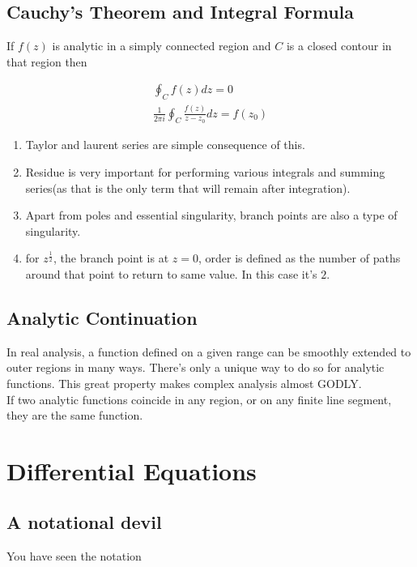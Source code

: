 \documentclass{report}
\begin{document}
\section{Cauchy's Theorem and Integral Formula} If $f(z)$ is analytic in a simply connected region and $C$ is a closed contour in that region then

\begin{gather}
\oint_{C}f(z)dz = 0\\
\frac{1}{2\pi i}\oint_{C}\frac{f(z)}{z-z_0}dz = f(z_0)
\end{gather}

\begin{enumerate}
  \item Taylor and laurent series are simple consequence of this.
  \item Residue is very important for performing various integrals and summing series(as that is the only term that will remain after integration). 
  \item Apart from poles and essential singularity, branch points are also a type of singularity.
  \item for $z^\frac{1}{2}$, the branch point is at $z=0$, order is defined as the number of paths around that point to return to same value. In this case it's $2$.
\end{enumerate}


\section{Analytic Continuation}
In real analysis, a function defined on a given range can be smoothly extended to outer regions in many ways. There's only a unique way to do so for analytic functions. This great property makes complex analysis almost GODLY.\\

\noindent If two analytic functions coincide in any region, or on any finite line segment, they are the same function.


\chapter{Differential Equations}

\section{A notational devil}

You have seen the notation 
\end{document}
